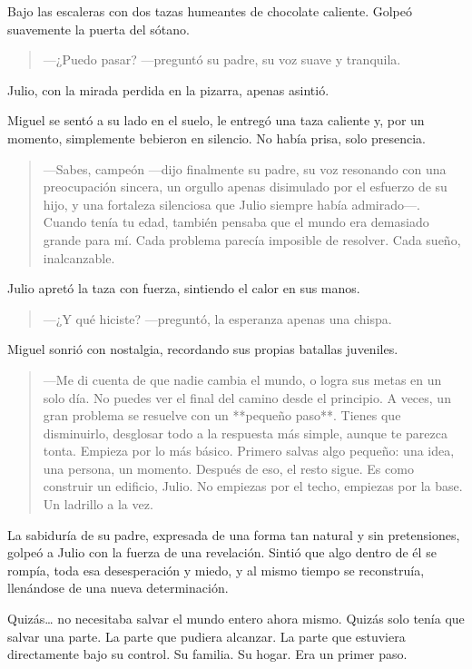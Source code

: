 \documentclass[a4paper,12pt]{book}
\begin{document}
Bajo las escaleras con dos tazas humeantes de chocolate caliente. Golpeó suavemente la puerta del sótano.

\begin{quote}
    —¿Puedo pasar? —preguntó su padre, su voz suave y tranquila.
\end{quote}

Julio, con la mirada perdida en la pizarra, apenas asintió.

Miguel se sentó a su lado en el suelo, le entregó una taza caliente y, por un momento, simplemente bebieron en silencio. No había prisa, solo presencia.

\begin{quote}
    —Sabes, campeón —dijo finalmente su padre, su voz resonando con una preocupación sincera, un orgullo apenas disimulado por el esfuerzo de su hijo, y una fortaleza silenciosa que Julio siempre había admirado—. Cuando tenía tu edad, también pensaba que el mundo era demasiado grande para mí. Cada problema parecía imposible de resolver. Cada sueño, inalcanzable.
\end{quote}

Julio apretó la taza con fuerza, sintiendo el calor en sus manos.

\begin{quote}
    —¿Y qué hiciste? —preguntó, la esperanza apenas una chispa.
\end{quote}

Miguel sonrió con nostalgia, recordando sus propias batallas juveniles.

\begin{quote}
    —Me di cuenta de que nadie cambia el mundo, o logra sus metas en un solo día. No puedes ver el final del camino desde el principio. A veces, un gran problema se resuelve con un **pequeño paso**. Tienes que disminuirlo, desglosar todo a la respuesta más simple, aunque te parezca tonta. Empieza por lo más básico. Primero salvas algo pequeño: una idea, una persona, un momento. Después de eso, el resto sigue. Es como construir un edificio, Julio. No empiezas por el techo, empiezas por la base. Un ladrillo a la vez.
\end{quote}

La sabiduría de su padre, expresada de una forma tan natural y sin pretensiones, golpeó a Julio con la fuerza de una revelación. Sintió que algo dentro de él se rompía, toda esa desesperación y miedo, y al mismo tiempo se reconstruía, llenándose de una nueva determinación.

Quizás… no necesitaba salvar el mundo entero ahora mismo. Quizás solo tenía que salvar una parte. La parte que pudiera alcanzar. La parte que estuviera directamente bajo su control. Su familia. Su hogar. Era un primer paso.
\end{document}
